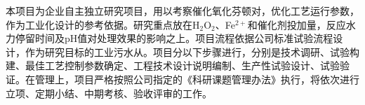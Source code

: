 本项目为企业自主独立研究项目，用以考察催化氧化芬顿对，优化工艺运行参数，作为工业化设计的参考依据。研究重点放在H$_2$O$_2$、Fe$^{2+}$和催化剂投加量，反应水力停留时间及pH值对处理效果的影响之上。项目流程依据公司标准试验流程设计，作为研究目标的工业污水从。项目分以下步骤进行，分别是技术调研、试验构建、最佳工艺控制参数确定、工程技术设计说明编制、生产性试验设计、试验验证。在管理上，项目严格按照公司指定的《科研课题管理办法》执行，将依次进行立项、定期小结、中期考核、验收评审的工作。